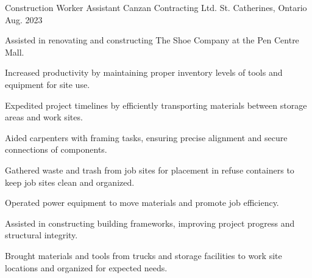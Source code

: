

\begin{cventries}
  \cventry
    {Construction Worker Assistant} %
    {Canzan Contracting Ltd.} %
    {St. Catherines, Ontario} %
    {Aug. 2023} %
    {
      \begin{cvitems} %
        \item {Assisted in renovating and constructing The Shoe Company at the Pen Centre Mall.}
        \item {Increased productivity by maintaining proper inventory levels of tools and equipment for site use.}
        \item {Expedited project timelines by efficiently transporting materials between storage areas and work sites.}
        \item {Aided carpenters with framing tasks, ensuring precise alignment and secure connections of components.}
        \item {Gathered waste and trash from job sites for placement in refuse containers to keep job sites clean and organized.}
        \item {Operated power equipment to move materials and promote job efficiency.}
        \item {Assisted in constructing building frameworks, improving project progress and structural integrity.}
        \item {Brought materials and tools from trucks and storage facilities to work site locations and organized for expected needs.}
      \end{cvitems}
    }


\end{cventries}
